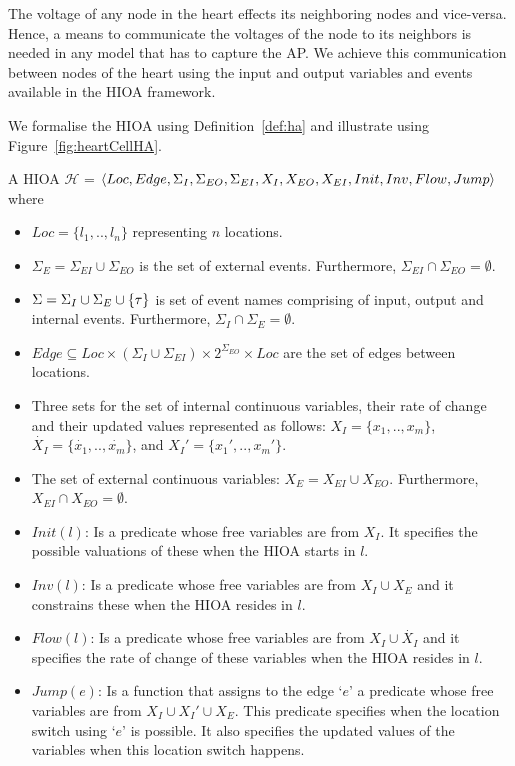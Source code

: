 The voltage of any node in the heart effects its neighboring nodes and
vice-versa. Hence, a means to communicate the voltages of the node to
its neighbors is needed in any model that has to capture the \ac{AP}. We
achieve this communication between nodes of the heart using the input
and output variables and events available in the \ac{HIOA} framework.

We formalise the \ac{HIOA} using Definition~\ref{def:ha} and illustrate
using Figure~\ref{fig:heartCellHA}.\newline


\begin{definition}
  A \acf{HIOA} \newline $\mathcal{H}$ =
  $\langle Loc, Edge, \Sigma_I, \Sigma_{EO}, \Sigma_{EI}, X_I, X_{EO},
  X_{EI}, \linebreak Init, Inv, Flow, Jump\rangle$ where
  \begin{itemize}
  \item $Loc=\{l_1,..,l_n\}$ representing $n$ locations.
  \item $\Sigma_{E} = \Sigma_{EI} \cup \Sigma_{EO}$ is the set of
    external events. Furthermore,
    \mbox{$\Sigma_{EI} \cap \Sigma_{EO} = \emptyset$}.
  \item $\Sigma=\Sigma_I \cup \Sigma_{E} \cup \{\tau\}$ is set of
    event names comprising of input, output and internal
    events. Furthermore, \mbox{$\Sigma_I \cap \Sigma_E = \emptyset$}.
  \item
    $Edge \subseteq Loc \times (\Sigma_I \cup \Sigma_{EI}) \times
    2^{\Sigma_{EO}} \times Loc$ are the set of edges between locations.
  \item Three sets for the set of internal continuous variables, their
    rate of change and their updated values represented as follows:
    $X_I=\{x_1,.., x_m\}$, $\dot{X_I}=\{\dot{x_1},.., \dot{x_m}\}$, and
    $X_I'=\{x_{1}',.., x_{m}'\}$.
  \item The set of external continuous variables:
    \mbox{$X_E = X_{EI} \cup X_{EO}$}. Furthermore,
    \mbox{$X_{EI} \cap X_{EO} = \emptyset$}.
  \item $Init(l)$: Is a predicate whose free variables are from
    $X_{I}$. It specifies the possible valuations of these when the HIOA
    starts in $l$.
  \item $Inv(l)$: Is a predicate whose free variables are from
    \mbox{$X_I \cup X_{E}$} and it constrains these when the HIOA
    resides in $l$.
  \item $Flow(l)$: Is a predicate whose free variables are from
    $X_I \cup \dot{X_I}$ and it specifies the rate of change of these
    variables when the HIOA resides in $l$.
  \item $Jump(e)$: Is a function that assigns to the edge `$e$' a
    predicate whose free variables are from $X_I \cup X_I' \cup X_E$.
    This predicate specifies when the location switch using `$e$' is
    possible. It also specifies the updated values of the variables when
    this location switch happens.
  \end{itemize}
  \label{def:ha}
\end{definition}

